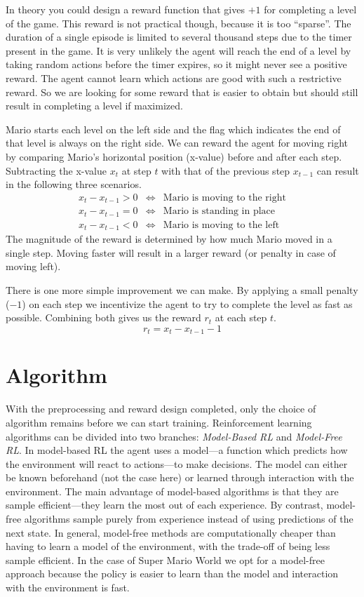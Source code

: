 \documentclass[a4paper]{article}
\begin{document}
In theory you could design a reward function that gives $+1$ for completing a level of the game.
This reward is not practical though, because it is too ``sparse''.
The duration of a single episode is limited to several thousand steps due to the timer present in the game.
It is very unlikely the agent will reach the end of a level by taking random actions before the timer expires, so it might never see a positive reward.
The agent cannot learn which actions are good with such a restrictive reward.
So we are looking for some reward that is easier to obtain but should still result in completing a level if maximized.

Mario starts each level on the left side and the flag which indicates the end of that level is always on the right side.
We can reward the agent for moving right by comparing Mario's horizontal position (x-value) before and after each step.
Subtracting the x-value $x_{t}$ at step $t$ with that of the previous step $x_{t-1}$ can result in the following three scenarios.
\begin{eqnarray*}
    x_{t} - x_{t-1} > 0&\iff&\text{Mario is moving to the right}\\
    x_{t} - x_{t-1} = 0&\iff&\text{Mario is standing in place}\\
    x_{t} - x_{t-1} < 0&\iff&\text{Mario is moving to the left}
\end{eqnarray*}
The magnitude of the reward is determined by how much Mario moved in a single step.
Moving faster will result in a larger reward (or penalty in case of moving left).

There is one more simple improvement we can make.
By applying a small penalty ($-1$) on each step we incentivize the agent to try to complete the level as fast as possible.
Combining both gives us the reward $r_{t}$ at each step $t$.
\[r_{t} = x_{t} - x_{t-1} - 1\]


\section{Algorithm} \label{s:algorithm}
With the preprocessing and reward design completed, only the choice of algorithm remains before we can start training.
Reinforcement learning algorithms can be divided into two branches: \emph{Model-Based RL} and \emph{Model-Free RL}.
In model-based RL the agent uses a model---a function which predicts how the environment will react to actions---to make decisions.
The model can either be known beforehand (not the case here) or learned through interaction with the environment.
The main advantage of model-based algorithms is that they are sample efficient---they learn the most out of each experience.
By contrast, model-free algorithms sample purely from experience instead of using predictions of the next state.
In general, model-free methods are computationally cheaper than having to learn a model of the environment, with the trade-off of being less sample efficient.
In the case of Super Mario World we opt for a model-free approach because the policy is easier to learn than the model and interaction with the environment is fast.
\end{document}
